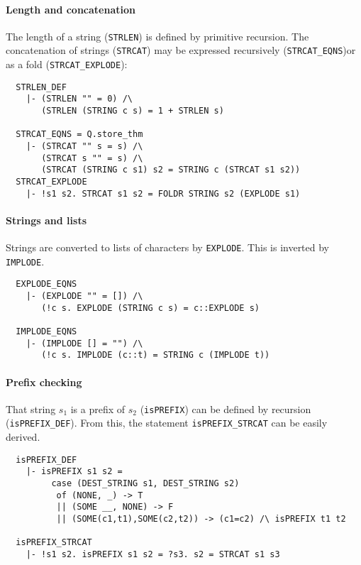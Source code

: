 \paragraph {Length and concatenation}

The length of a string ({\small\verb+STRLEN+}) is defined by primitive
recursion. The concatenation of strings ({\small\verb+STRCAT+}) may be
expressed recursively ({\small\verb+STRCAT_EQNS+})or as a fold
({\small\verb+STRCAT_EXPLODE+}):
%
{\small
\begin{verbatim}
  STRLEN_DEF
    |- (STRLEN "" = 0) /\
       (STRLEN (STRING c s) = 1 + STRLEN s)

  STRCAT_EQNS = Q.store_thm
    |- (STRCAT "" s = s) /\
       (STRCAT s "" = s) /\
       (STRCAT (STRING c s1) s2 = STRING c (STRCAT s1 s2))
  STRCAT_EXPLODE
    |- !s1 s2. STRCAT s1 s2 = FOLDR STRING s2 (EXPLODE s1)
\end{verbatim}}


\paragraph {Strings and lists}

Strings are converted to lists of characters by
{\small\verb+EXPLODE+}. This is inverted by {\small\verb+IMPLODE+}.
%
{\small
\begin{verbatim}
  EXPLODE_EQNS
    |- (EXPLODE "" = []) /\
       (!c s. EXPLODE (STRING c s) = c::EXPLODE s)

  IMPLODE_EQNS
    |- (IMPLODE [] = "") /\
       (!c s. IMPLODE (c::t) = STRING c (IMPLODE t))
\end{verbatim}}

\paragraph {Prefix checking}

That string $s_1$ is a prefix of $s_2$ ({\small\verb+isPREFIX+}) can be
defined by recursion ({\small\verb+isPREFIX_DEF+}). From this, the
statement {\small\verb+isPREFIX_STRCAT+} can be easily derived.
%
{\small
\begin{verbatim}
  isPREFIX_DEF
    |- isPREFIX s1 s2 =
         case (DEST_STRING s1, DEST_STRING s2)
          of (NONE, _) -> T
          || (SOME __, NONE) -> F
          || (SOME(c1,t1),SOME(c2,t2)) -> (c1=c2) /\ isPREFIX t1 t2

  isPREFIX_STRCAT
    |- !s1 s2. isPREFIX s1 s2 = ?s3. s2 = STRCAT s1 s3
\end{verbatim}
}


